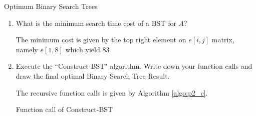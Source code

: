 \documentclass{article}
\numberwithin{table}{section}
\numberwithin{figure}{section}
\begin{document}
\begin{section}{Optimum Binary Search Trees}
\begin{enumerate}
    \item What is the minimum search time cost of a BST for $A$?
    \begin{tcolorbox}
        The minimum cost is given by the top right element on $e[i,j]$ matrix, namely $e[1,8]$ which yield $83$
    \end{tcolorbox}
    
    \item Execute the ``Construct-BST" algorithm. Write down your function calls and draw the final optimal Binary Search Tree Result.
    

    \begin{tcolorbox}[
        breakable,
    ]
    The recursive function calls is given by Algorithm \ref{algo:p2_c}.

    \begin{minipage}[H]{\linewidth}
    \begin{algorithm}[H]
    \caption{Function call of Construct-BST}
    \hspace{0em} \\ 
      \hspace{1em} \\ 
        \hspace{2em} \\ 
          \hspace{3em} \\ 
          \hspace{3em} \\ 
        \hspace{2em} \\ 
          \hspace{3em} \\ 
          \hspace{3em} \\ 
      \hspace{1em} \\ 
        \hspace{2em} \\ 
          \hspace{3em} \\ 
          \hspace{3em} \\ 

\end{algorithm}
\end{minipage}
\end{tcolorbox}
\end{enumerate}
\end{section}
\end{document}
